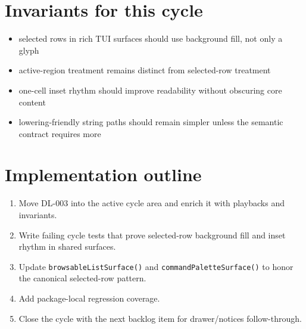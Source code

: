 \section{Invariants for this cycle}\label{record-170-invariants-for-this-cycle}

\begin{itemize}
\tightlist
\item
  selected rows in rich TUI surfaces should use background fill, not only a glyph
\item
  active-region treatment remains distinct from selected-row treatment
\item
  one-cell inset rhythm should improve readability without obscuring core content
\item
  lowering-friendly string paths should remain simpler unless the semantic contract requires more
\end{itemize}

\section{Implementation outline}\label{record-170-implementation-outline}

\begin{enumerate}
\def\labelenumi{\arabic{enumi}.}
\tightlist
\item
  Move DL-003 into the active cycle area and enrich it with playbacks and invariants.
\item
  Write failing cycle tests that prove selected-row background fill and inset rhythm in shared surfaces.
\item
  Update \texttt{b\allowbreak{}r\allowbreak{}o\allowbreak{}w\allowbreak{}s\allowbreak{}a\allowbreak{}b\allowbreak{}l\allowbreak{}e\allowbreak{}L\allowbreak{}i\allowbreak{}s\allowbreak{}t\allowbreak{}S\allowbreak{}u\allowbreak{}r\allowbreak{}f\allowbreak{}a\allowbreak{}c\allowbreak{}e\allowbreak{}(\allowbreak{})} and \texttt{c\allowbreak{}o\allowbreak{}m\allowbreak{}m\allowbreak{}a\allowbreak{}n\allowbreak{}d\allowbreak{}P\allowbreak{}a\allowbreak{}l\allowbreak{}e\allowbreak{}t\allowbreak{}t\allowbreak{}e\allowbreak{}S\allowbreak{}u\allowbreak{}r\allowbreak{}f\allowbreak{}a\allowbreak{}c\allowbreak{}e\allowbreak{}(\allowbreak{})} to honor the canonical selected-row pattern.
\item
  Add package-local regression coverage.
\item
  Close the cycle with the next backlog item for drawer/notices follow-through.
\end{enumerate}

